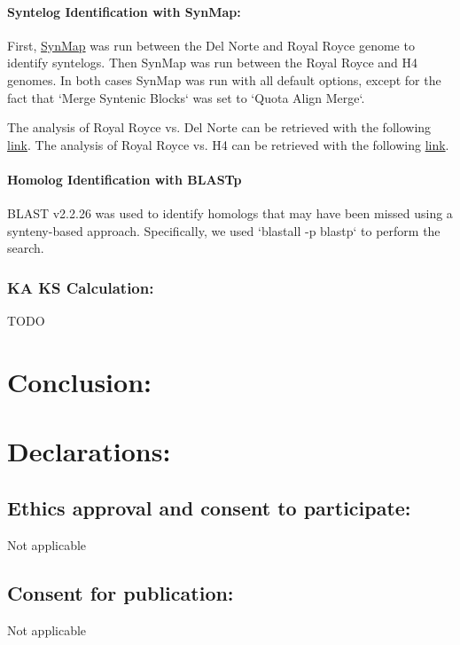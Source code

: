 \documentclass[fleqn,10pt]{olplainarticle}
\begin{document}
\paragraph{Syntelog Identification with SynMap:} \label{sec:methods_syntelogs}
First, \href{https://genomevolution.org/CoGe/SynMap.pl}{SynMap} was run between the Del Norte and Royal Royce genome to identify syntelogs.
Then SynMap was run between the Royal Royce and H4 genomes.
In both cases SynMap was run with all default options, except for the fact that `Merge Syntenic Blocks` was set to `Quota Align Merge`.

The analysis of Royal Royce vs. Del Norte can be retrieved with the following \href{ https://genomevolution.org/r/1r9uk}{link}.
The analysis of Royal Royce vs. H4 can be retrieved with the following \href{https://genomevolution.org/r/1r9uy}{link}.

\paragraph{Homolog Identification with BLASTp} \label{sec:methods_homologs}
BLAST v2.2.26 was used to identify homologs that may have been missed using a synteny-based approach.
Specifically, we used `blastall -p blastp` to perform the search. 

\subsubsection{KA KS Calculation:} \label{sec:ka_ks}
TODO

\section{Conclusion:}

\section{Declarations:}
\subsection{Ethics approval and consent to participate:}
Not applicable

\subsection{Consent for publication:}
Not applicable
\end{document}
